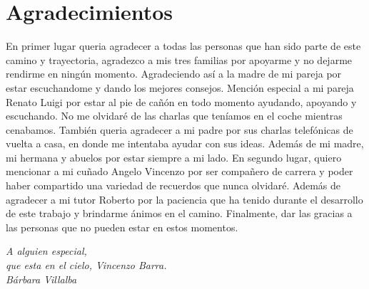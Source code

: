 \cleardoublepage

\chapter*{Agradecimientos}

En primer lugar queria agradecer a todas las personas que han sido parte de este camino y trayectoria, agradezco a mis tres familias por apoyarme y no 
dejarme rendirme en ningún momento. Agradeciendo así a la madre de mi pareja por estar escuchandome y dando los mejores consejos. \newline
\newline
Mención especial a mi pareja Renato Luigi por estar al pie de cañón en todo momento ayudando, apoyando y escuchando. No me olvidaré de las charlas que teníamos
en el coche mientras cenabamos. También queria agradecer a mi padre por sus charlas telefónicas de vuelta a casa, en donde me intentaba ayudar con sus ideas. Además de mi madre,
mi hermana y abuelos por estar siempre a mi lado.\newline
\newline
En segundo lugar, quiero mencionar a mi cuñado Angelo Vincenzo por ser compañero de carrera y poder haber compartido una variedad de recuerdos que nunca olvidaré. \newline
\newline
Además de agradecer a mi tutor Roberto por la paciencia que ha tenido durante el desarrollo de este trabajo y brindarme ánimos en el camino. \newline
\newline
Finalmente, dar las gracias a las personas que no pueden estar en estos momentos.


\begin{flushright}
	\vspace{4.0 cm}
	\emph{A alguien especial,\\
    que esta en el cielo, Vincenzo Barra.}\\
	\emph{Bárbara Villalba}
\end{flushright}

\thispagestyle{empty}

